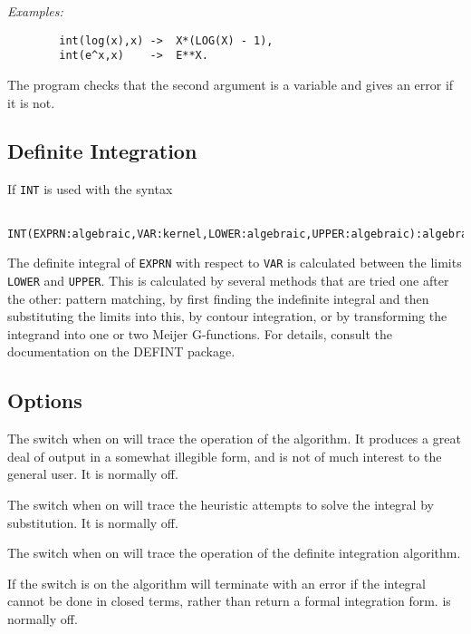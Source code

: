 \textit{Examples:}
\begin{verbatim}
        int(log(x),x) ->  X*(LOG(X) - 1),
        int(e^x,x)    ->  E**X.
\end{verbatim}
The program checks that the second argument is a variable and gives an
error if it is not.

\subsection{Definite Integration} 

If \texttt{INT} is used with the syntax

\begin{verbatim}
   INT(EXPRN:algebraic,VAR:kernel,LOWER:algebraic,UPPER:algebraic):algebraic.
\end{verbatim}

The definite integral of \texttt{EXPRN} with respect to \texttt{VAR} is
calculated between the limits \texttt{LOWER} and \texttt{UPPER}.
This is calculated by several methods that are tried one after the other:
pattern matching, by first finding
the indefinite integral and then substituting the limits into this, by contour integration, or
by transforming the integrand into one or two Meijer G-functions.
For details, consult
the documentation on the DEFINT package.


\subsection{Options}
\hypertarget{switch:TRINT}{}
\hypertarget{switch:TRINTSUBST}{}
\hypertarget{switch:TRDEFINT}{}
\hypertarget{switch:FAILHARD}{}
\hypertarget{switch:NOLNR}{}
\hypertarget{switch:NOINTSUBST}{}

The switch  when on will trace the operation of the algorithm. It
produces a great deal of output in a somewhat illegible form, and is not
of much interest to the general user. It is normally off.

The switch  when on will trace the heuristic attempts to
solve the integral by substitution. It is normally off.

The switch  when on will trace the operation of the definite integration algorithm.

If the switch  is on the algorithm will terminate with an
error if the integral cannot be done in closed terms, rather than return a
formal integration form.  is normally off.

